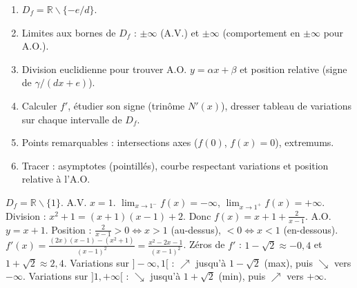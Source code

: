 \documentclass[11pt]{article}
\newcommand{\legende}[1]{\par\vspace{6pt}{\popsemi\fontsize{9}{11.5}\selectfont\color{popmuted}#1}}
\def\setminus{\mathbin{\backslash}}\let\smallsetminus\setminus
\begin{document}
\begin{methode}
\begin{enumerate}
  \item $D_f = \mathbb{R} \setminus \{ -e/d \}$.
  \item Limites aux bornes de $D_f$ : $\pm\infty$ (A.V.) et $\pm\infty$ (comportement en $\pm\infty$ pour A.O.).
  \item Division euclidienne pour trouver A.O. $y=\alpha x+\beta$ et position relative (signe de $\gamma/(dx+e)$).
  \item Calculer $f'$, étudier son signe (trinôme $N'(x)$), dresser tableau de variations sur chaque intervalle de $D_f$.
  \item Points remarquables : intersections axes ($f(0)$, $f(x)=0$), extremums.
  \item Tracer : asymptotes (pointillés), courbe respectant variations et position relative à l'A.O.
\end{enumerate}
\end{methode}

\begin{exemplebox}[Étude de $f(x) = \frac{x^2+1}{x-1}$]
$D_f = \mathbb{R} \setminus \{1\}$.
A.V. $x=1$. $\lim_{x\to 1^-} f(x) = -\infty$, $\lim_{x\to 1^+} f(x) = +\infty$.
Division : $x^2+1 = (x+1)(x-1) + 2$. Donc $f(x) = x+1 + \frac{2}{x-1}$.
A.O. $y = x+1$. Position : $\frac{2}{x-1} > 0 \iff x>1$ (au-dessus), $<0 \iff x<1$ (en-dessous).
$f'(x) = \frac{(2x)(x-1) - (x^2+1)}{(x-1)^2} = \frac{x^2 - 2x - 1}{(x-1)^2}$.
Zéros de $f'$ : $1-\sqrt{2} \approx -0,4$ et $1+\sqrt{2} \approx 2,4$.
Variations sur $]-\infty, 1[$ : $\nearrow$ jusqu'à $1-\sqrt{2}$ (max), puis $\searrow$ vers $-\infty$.
Variations sur $]1, +\infty[$ : $\searrow$ jusqu'à $1+\sqrt{2}$ (min), puis $\nearrow$ vers $+\infty$.
\tcblower
\begin{popfigure}
\legende{Courbe de $f(x)=\frac{x^2+1}{x-1}$ avec asymptotes.}
\end{popfigure}
\end{exemplebox}
\end{document}
